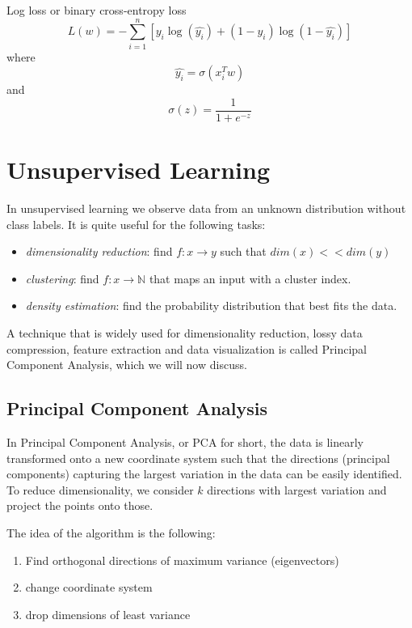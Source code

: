 \documentclass{article}
\begin{document}
Log loss or binary cross-entropy loss
\[L(w) = -\sum_{i=1}^n [y_i\log(\hat{y_i})+(1-y_i)\log(1-\hat{y_i})]\]
where \[\hat{y_i} = \sigma (x_i^Tw)\] and
\[\sigma (z)=\frac{1}{1+e^{-z}}\]

\section{Unsupervised Learning}\label{unsupervised-learning-1}

In unsupervised learning we observe data from an unknown distribution
without class labels. It is quite useful for the following tasks:

\begin{itemize}
\tightlist
\item
  \emph{dimensionality reduction}: find \(f: x\rightarrow y\) such that
  \(dim(x)<<dim(y)\)
\item
  \emph{clustering}: find \(f: x\rightarrow \mathbb{N}\) that maps an
  input with a cluster index.
\item
  \emph{density estimation}: find the probability distribution that best
  fits the data.
\end{itemize}

A technique that is widely used for dimensionality reduction, lossy data
compression, feature extraction and data visualization is called
Principal Component Analysis, which we will now discuss.

\subsection{Principal Component
Analysis}\label{principal-component-analysis}

In Principal Component Analysis, or PCA for short, the data is linearly
transformed onto a new coordinate system such that the directions
(principal components) capturing the largest variation in the data can
be easily identified. To reduce dimensionality, we consider \(k\)
directions with largest variation and project the points onto those.

The idea of the algorithm is the following:

\begin{enumerate}
\def\labelenumi{\arabic{enumi}.}
\tightlist
\item
  Find orthogonal directions of maximum variance (eigenvectors)
\item
  change coordinate system
\item
  drop dimensions of least variance
\end{enumerate}
\end{document}
